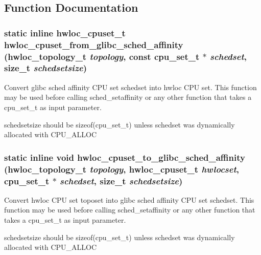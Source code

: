 \subsection{Function Documentation}
\hypertarget{group__hwlocality__glibc__sched_ga95a1b94fc109895ee13b17bddac08f5f}{
\subsubsection[{hwloc\_\-cpuset\_\-from\_\-glibc\_\-sched\_\-affinity}]{\setlength{\rightskip}{0pt plus 5cm}static inline {\bf hwloc\_\-cpuset\_\-t} hwloc\_\-cpuset\_\-from\_\-glibc\_\-sched\_\-affinity ({\bf hwloc\_\-topology\_\-t} {\em topology}, \/  const cpu\_\-set\_\-t $\ast$ {\em schedset}, \/  size\_\-t {\em schedsetsize})}}
\label{group__hwlocality__glibc__sched_ga95a1b94fc109895ee13b17bddac08f5f}


Convert glibc sched affinity CPU set {\ttfamily schedset} into hwloc CPU set. This function may be used before calling sched\_\-setaffinity or any other function that takes a cpu\_\-set\_\-t as input parameter.

{\ttfamily schedsetsize} should be sizeof(cpu\_\-set\_\-t) unless {\ttfamily schedset} was dynamically allocated with CPU\_\-ALLOC \hypertarget{group__hwlocality__glibc__sched_ga8d52ded42a9b3d832672d642798cdd8a}{
\subsubsection[{hwloc\_\-cpuset\_\-to\_\-glibc\_\-sched\_\-affinity}]{\setlength{\rightskip}{0pt plus 5cm}static inline void hwloc\_\-cpuset\_\-to\_\-glibc\_\-sched\_\-affinity ({\bf hwloc\_\-topology\_\-t} {\em topology}, \/  {\bf hwloc\_\-cpuset\_\-t} {\em hwlocset}, \/  cpu\_\-set\_\-t $\ast$ {\em schedset}, \/  size\_\-t {\em schedsetsize})}}
\label{group__hwlocality__glibc__sched_ga8d52ded42a9b3d832672d642798cdd8a}


Convert hwloc CPU set {\ttfamily toposet} into glibc sched affinity CPU set {\ttfamily schedset}. This function may be used before calling sched\_\-setaffinity or any other function that takes a cpu\_\-set\_\-t as input parameter.

{\ttfamily schedsetsize} should be sizeof(cpu\_\-set\_\-t) unless {\ttfamily schedset} was dynamically allocated with CPU\_\-ALLOC 
